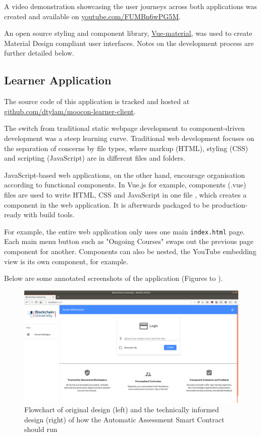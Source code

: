 A video demonstration showcasing the user journeys across both applications was created and 
available on \href{https://youtu.be/FUMBn6wPG5M}{\underline{youtube.com/FUMBn6wPG5M}}.

An open source styling and component library, \href{https://vuematerial.io/}{Vue-material}, was used to 
create Material Design compliant user interfaces. Notes on the development process are further detailed below.

\subsection{Learner Application}

The source code of this application is tracked and hosted at 
\href{https://github.com/dtylam/moocon-learner-client}{\underline{github.com/dtylam/moocon-learner-client}}.

The switch from traditional static webpage development to component-driven development was a steep learning curve.
Traditional web development focuses on the separation of concerns by file types, where markup (HTML), 
styling (CSS) and scripting (JavaScript) are in different files and folders.

JavaScript-based web applications, on the other hand, encourage organisation according to functional components. 
In Vue.js for example, components (.vue) files are used to write HTML, CSS and JavaScript in one file \citep{vue2017components}, 
which creates a component in the web application. It is afterwards packaged to be production-ready with build tools.

For example, the entire web application only uses one main \texttt{index.html} page. Each main menu button 
such as "Ongoing Courses" swaps out the previous page component for another. Components can also be nested, 
the YouTube embedding view is its own component, for example.

Below are some annotated screenshots of the application (Figures to ).

\begin{figure}[!ht]
	\centering
	\includegraphics[width=1.0\textwidth]{Learner_login}
	\caption[Learner Application Login Page]
	{Flowchart of original design (left) and the technically informed design (right) of how the Automatic Assessment Smart Contract should run}
	\label{fig:Learner_login}
\end{figure}

